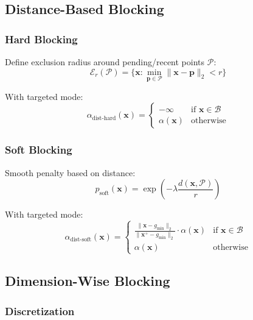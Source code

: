 \documentclass[11pt,a4paper]{article}
\begin{document}
\subsection{Distance-Based Blocking}

\subsubsection{Hard Blocking}

Define exclusion radius around pending/recent points $\mathcal{P}$:
\begin{equation}
    \mathcal{E}_r(\mathcal{P}) = \{\mathbf{x} : \min_{\mathbf{p} \in \mathcal{P}} \|\mathbf{x} - \mathbf{p}\|_2 < r\}
\end{equation}

With targeted mode:
\begin{equation}
    \alpha_{\text{dist-hard}}(\mathbf{x}) = 
    \begin{cases}
        -\infty & \text{if } \mathbf{x} \in \mathcal{B} \\
        \alpha(\mathbf{x}) & \text{otherwise}
    \end{cases}
\end{equation}

\subsubsection{Soft Blocking}

Smooth penalty based on distance:
\begin{equation}
    p_{\text{soft}}(\mathbf{x}) = \exp\left(-\lambda \frac{d(\mathbf{x}, \mathcal{P})}{r}\right)
\end{equation}

With targeted mode:
\begin{equation}
    \alpha_{\text{dist-soft}}(\mathbf{x}) = 
    \begin{cases}
        \frac{\|\mathbf{x} - g_{\min}\|_2}{\|\mathbf{x}^+ - g_{\min}\|_2} \cdot \alpha(\mathbf{x}) & \text{if } \mathbf{x} \in \mathcal{B} \\
        \alpha(\mathbf{x}) & \text{otherwise}
    \end{cases}
\end{equation}

\subsection{Dimension-Wise Blocking}

\subsubsection{Discretization}
\end{document}

